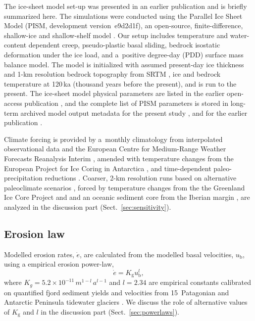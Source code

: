 \documentclass[esurf, manuscript]{copernicus}
\begin{document}
    The ice-sheet model set-up was presented in an earlier publication
    \citep{Seguinot.etal.2018} and is briefly summarized here. The simulations
    were conducted using the Parallel Ice Sheet Model (PISM, development
    version~e9d2d1f), an open-source, finite-difference, shallow-ice and
    shallow-shelf model \citep{PISM-authors.2017}. Our setup includes
    temperature and water-content dependent creep, pseudo-plastic basal
    sliding, bedrock isostatic deformation under the ice
    load, and a~positive degree-day (PDD) surface mass balance model. The model
    is initialized with assumed present-day ice thickness and 1-km resolution
    bedrock topography from SRTM \citep{Jarvis.etal.2008},
    ice and bedrock temperature at 120\,ka (thousand years before the present),
    and is run to the present. The ice-sheet model physical parameters are listed
    in the earlier open-access publication \citep{Seguinot.etal.2018}, and the
    complete list of PISM
    parameters is stored in long-term archived model output metadata for the
    present study \citep{Seguinot.2021}, and for the earlier publication
    \citep{Seguinot.2020, Seguinot.2020a}.

    Climate forcing is provided by a~monthly climatology from interpolated
    observational data \citep[WorldClim;][]{Hijmans.etal.2005} and the European
    Centre for Medium-Range Weather Forecasts Reanalysis Interim
    \citep[ERA-Interim;][]{Dee.etal.2011}, amended with temperature changes
    from the European Project for Ice Coring in Antarctica
    \citep[EPICA;][] {Jouzel.etal.2007}, and time-dependent paleo-precipitation
    reductions \citep{Huybrechts.2002}. Coarser, 2-km resolution runs based on
    alternative paleoclimate scenarios \citep{Seguinot.etal.2018}, forced by
    temperature changes from the the Greenland Ice Core Project
    \citep[GRIP;][]{Dansgaard.etal.1993} and and an oceanic sediment core from
    the Iberian margin \citep[MD01-2444;][]{Martrat.etal.2007}, are analyzed
    in the discussion part (Sect.~\ref{sec:sensitivity}).

\subsection{Erosion law}

    Modelled erosion rates, $\dot{e}$, are calculated from the modelled basal
    velocities, $u_\mathrm{b}$, using a empirical erosion power-law,
    \begin{equation}
        \dot{e} = K_\mathrm{g} u_\mathrm{b}^l ,
    \end{equation}
    where $K_g = 5.2\times 10^{-11}\,m^{1-l}\,a^{l-1}$ and $l = 2.34$ are
    empirical constants calibrated on quantified fjord sediment yields and
    velocities from 15~Patagonian and Antarctic Peninsula tidewater glaciers
    \citep[using the full dataset from][including outliers]{Koppes.etal.2015}.
    We discuss the role of alternative values of
    $K_\mathrm{g}$ and $l$ in the discussion part (Sect.~\ref{sec:powerlaws}).
\end{document}
